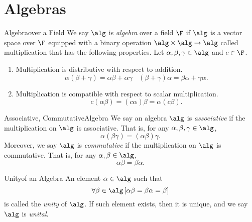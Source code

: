 \documentclass[linearalgebraII]{subfiles}
\begin{document}

    \section{Algebras} 

    \begin{definition}{Algebra}{over a Field}
        We say $\alg$ is \emph{algebra} over a field $\F$ if $\alg$ is a vector space over $\F$ equipped with a binary operation $\alg\times\alg\to\alg$ called multiplication that has the following properties. Let $\alpha, \beta, \gamma\in \alg$ and $c\in \F$. 

        \begin{enumerate}
            \item Multiplication is distributive with respect to addition.
                \begin{equation*}
                    \alpha(\beta+\gamma) = \alpha\beta + \alpha\gamma \ \ \ \ (\beta+\gamma)\alpha = \beta\alpha + \gamma\alpha.
                \end{equation*}
            \item Multiplication is compatible with respect to scalar multiplication.
                \begin{equation*}
                    c(\alpha\beta) = (c\alpha)\beta = \alpha(c\beta).
                \end{equation*}
        \end{enumerate}
    \end{definition}

    \begin{definition}{Associative, Commutative}{Algebra}
        We say an algebra $\alg$ is \emph{associative} if the multiplication on $\alg$ is associative. That is, for any $\alpha,\beta,\gamma\in\alg$,
        \begin{equation*}
            \alpha(\beta\gamma) = (\alpha\beta)\gamma.
        \end{equation*}
        Moreover, we say $\alg$ is \emph{commutative} if the multiplication on $\alg$ is commutative. That is, for any $\alpha,\beta\in\alg$,
        \begin{equation*}
            \alpha\beta = \beta\alpha.
        \end{equation*}
    \end{definition}

    \begin{definition}{Unity}{of an Algebra}
        An element $\alpha\in\alg$ such that
        \begin{equation*}
            \forall\beta\in\alg \left[ \alpha\beta = \beta\alpha = \beta \right]  
        \end{equation*}
        is called the \emph{unity} of $\alg$. If such element exists, then it is unique, and we say $\alg$ is \emph{unital}.
    \end{definition}
\end{document}
